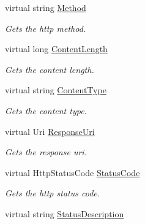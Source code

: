 \begin{DoxyCompactItemize}
\item 
virtual string \hyperlink{class_accela_1_1_windows_store_s_d_k_1_1_http_web_response_wrapper_ab5ad839fb23f704e437df68091ae3eeb}{Method}
\begin{DoxyCompactList}\small\item\em Gets the http method. \end{DoxyCompactList}\item 
virtual long \hyperlink{class_accela_1_1_windows_store_s_d_k_1_1_http_web_response_wrapper_aabef1a4f45eb5ce99c543df9d313e461}{Content\+Length}
\begin{DoxyCompactList}\small\item\em Gets the content length. \end{DoxyCompactList}\item 
virtual string \hyperlink{class_accela_1_1_windows_store_s_d_k_1_1_http_web_response_wrapper_a785590f481ba6bd7ba17d1b7bc1b120e}{Content\+Type}
\begin{DoxyCompactList}\small\item\em Gets the content type. \end{DoxyCompactList}\item 
virtual Uri \hyperlink{class_accela_1_1_windows_store_s_d_k_1_1_http_web_response_wrapper_ae5f3023286e8dbbae241152986ce0a1f}{Response\+Uri}
\begin{DoxyCompactList}\small\item\em Gets the response uri. \end{DoxyCompactList}\item 
virtual Http\+Status\+Code \hyperlink{class_accela_1_1_windows_store_s_d_k_1_1_http_web_response_wrapper_a5c032047ac99d6fb4cb48df21841a666}{Status\+Code}
\begin{DoxyCompactList}\small\item\em Gets the http status code. \end{DoxyCompactList}\item 
virtual string \hyperlink{class_accela_1_1_windows_store_s_d_k_1_1_http_web_response_wrapper_a8a5a39715392836296662b8e1d3b41de}{Status\+Description}

\end{DoxyCompactItemize}
